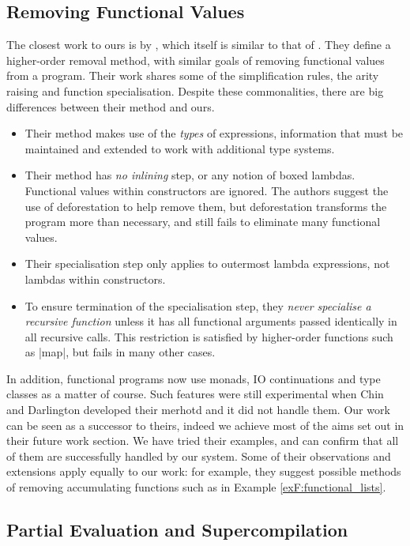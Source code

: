 \subsection{Removing Functional Values}

The closest work to ours is by \citet{chin:higher_order_removal}, which itself is similar to that of \citet{nelan:firstification}. They define a higher-order removal method, with similar goals of removing functional values from a program. Their work shares some of the simplification rules, the arity raising and function specialisation. Despite these commonalities, there are big differences between their method and ours.

\begin{itemize}
\item Their method makes use of the \textit{types} of expressions, information that must be maintained and extended to work with additional type systems.
\item Their method has \textit{no inlining} step, or any notion of boxed lambdas. Functional values within constructors are ignored. The authors suggest the use of deforestation \cite{wadler:deforestation} to help remove them, but deforestation transforms the program more than necessary, and still fails to eliminate many functional values.
\item Their specialisation step only applies to outermost lambda expressions, not lambdas within constructors.
\item To ensure termination of the specialisation step, they \textit{never specialise a recursive function} unless it has all functional arguments passed identically in all recursive calls. This restriction is satisfied by higher-order functions such as |map|, but fails in many other cases.
\end{itemize}

In addition, functional programs now use monads, IO continuations and type classes as a matter of course. Such features were still experimental when Chin and Darlington developed their merhotd and it did not handle them. Our work can be seen as a successor to theirs, indeed we achieve most of the aims set out in their future work section. We have tried their examples, and can confirm that all of them are successfully handled by our system. Some of their observations and extensions apply equally to our work: for example, they suggest possible methods of removing accumulating functions such as in Example \ref{exF:functional_lists}.

\subsection{Partial Evaluation and Supercompilation}

